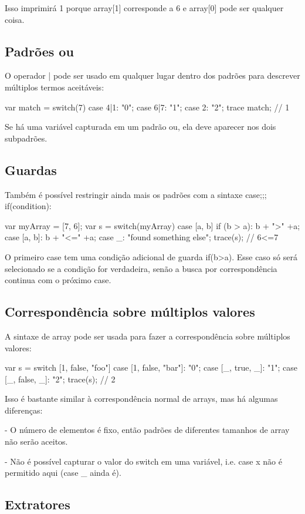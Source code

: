 {Isso imprimirá 1 porque array[1] corresponde a 6 e array[0] pode ser qualquer coisa.

\subsection{Padrões ou}

O operador | pode ser usado em qualquer lugar dentro dos padrões para descrever múltiplos termos aceitáveis:

var match = switch(7) {
   case 4|1: "0";
   case 6|7: "1";
   case 2: "2";
}
trace match; // 1

Se há uma variável capturada em um padrão ou, ela deve aparecer nos dois subpadrões.

\subsection{Guardas}

Também é possível restringir ainda mais os padrões com a sintaxe case;;; if(condition):

var myArray = [7, 6];
var s = switch(myArray) {
    case [a, b] if (b > a): b + ">" +a;
    case [a, b]: b + "<=" +a;
    case _: "found something else";
}
trace(s); // 6<=7

O primeiro case tem uma condição adicional de guarda if(b>a). Esse caso só será selecionado se a condição for verdadeira, senão a busca por correspondência continua com o próximo case.

\subsection{Correspondência sobre múltiplos valores}

A sintaxe de array pode ser usada para fazer a correspondência sobre múltiplos valores:

var s = switch [1, false, "foo"] {
    case [1, false, "bar"]: "0";
    case [_, true, _]: "1";
    case [_, false, _]: "2";
}
trace(s); // 2

Isso é bastante similar à correspondência normal de arrays, mas há algumas diferenças:

  - O número de elementos é fixo, então padrões de diferentes tamanhos de array não serão aceitos.

  - Não é possível capturar o valor do switch em uma variável, i.e. case x não é permitido aqui (case _ ainda é).

\subsection{Extratores}

}
